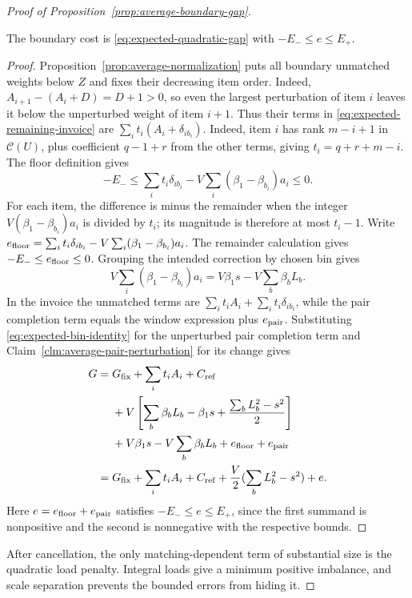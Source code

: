 \begin{proof}[Proof of Proposition~\ref{prop:average-boundary-gap}]
\begin{claim}
\label{clm:average-linear-cancellation}
The boundary cost is \eqref{eq:expected-quadratic-gap} with $-E_-\le e\le E_+$.
\end{claim}
\begin{proof}
Proposition~\ref{prop:average-normalization} puts all boundary
unmatched weights below $Z$ and fixes their decreasing item order. Indeed,
$A_{i+1}-(A_i+D)=D+1>0$, so even the largest perturbation of item
$i$ leaves it below the unperturbed weight of item $i+1$.
Thus their terms in \eqref{eq:expected-remaining-invoice} are
$\sum_i t_i(A_i+\delta_{ib_i})$.
Indeed, item $i$ has rank $m-i+1$ in $\mathcal C(U)$, plus
coefficient $q-1+r$ from the other terms, giving $t_i=q+r+m-i$.
The floor definition gives
\[
 -E_-\le
 \sum_i t_i\delta_{ib_i}
       -V\sum_i(\beta_1-\beta_{b_i})a_i
 \le0.
\]
For each item, the difference is minus the remainder when the
integer $V(\beta_1-\beta_{b_i})a_i$ is divided by $t_i$; its
magnitude is therefore at most $t_i-1$.
Write
$e_{\rm floor}=\sum_i t_i\delta_{ib_i}
                 -V\sum_i(\beta_1-\beta_{b_i})a_i$.
The remainder calculation gives $-E_-\le e_{\rm floor}\le0$.
Grouping the intended correction by chosen bin gives
\[
 V\sum_i(\beta_1-\beta_{b_i})a_i
 =V\beta_1s-V\sum_b\beta_bL_b.
\]
In the invoice the unmatched terms are
$\sum_i t_iA_i+\sum_i t_i\delta_{ib_i}$, while the pair
completion term equals the window expression plus $e_{\rm pair}$.
Substituting \eqref{eq:expected-bin-identity} for the unperturbed
pair completion term and Claim~\ref{clm:average-pair-perturbation}
for its change gives
\begin{align*}
 G={}&G_{\mathrm{fix}}+\sum_i t_iA_i+C_{\mathrm{ref}}\\
 &+V\left[\sum_b\beta_bL_b-\beta_1s
              +\frac{\sum_bL_b^2-s^2}{2}\right]\\
 &+V\beta_1s-V\sum_b\beta_bL_b
       +e_{\rm floor}+e_{\rm pair}\\
 ={}&G_{\mathrm{fix}}+\sum_i t_iA_i+C_{\mathrm{ref}}
       +\frac V2(\sum_bL_b^2-s^2)+e.
\end{align*}
Here $e=e_{\rm floor}+e_{\rm pair}$ satisfies
$-E_-\le e\le E_+$, since the first summand is nonpositive
and the second is nonnegative with the respective bounds.
\end{proof}
After cancellation, the only matching-dependent term of substantial
size is the quadratic load penalty. Integral loads give a minimum
positive imbalance, and scale separation prevents the bounded errors
from hiding it.


\end{proof}
